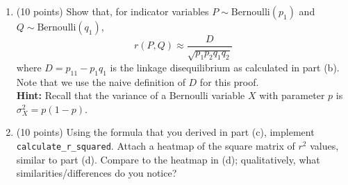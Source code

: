 \begin{enumerate}[resume]
    \item (10 points) 
    Show that, for indicator variables $P \sim \text{Bernoulli}(p_1)$ and $Q \sim \text{Bernoulli}(q_1)$, $$r(P, Q) \approx \frac{D}{\sqrt{p_1p_2q_1q_2}}$$
    where $D = p_{11} - p_1q_1$ is the linkage disequilibrium as calculated in part (b). Note that we use the naive definition of $D$ for this proof. \\
    
    \textbf{Hint:} Recall that the variance of a Bernoulli variable $X$ with parameter $p$ is $\sigma^2_X = p(1-p)$.

    \begin{solution}
    \end{solution}

    \item (10 points) Using the formula that you derived in part (c), implement \texttt{calculate\_r\_squared}. Attach a heatmap of the square matrix of $r^2$ values, similar to part (d). Compare to the heatmap in (d); qualitatively, what similarities/differences do you notice? 
    \begin{solution}
    \end{solution}
\end{enumerate}
\newpage
